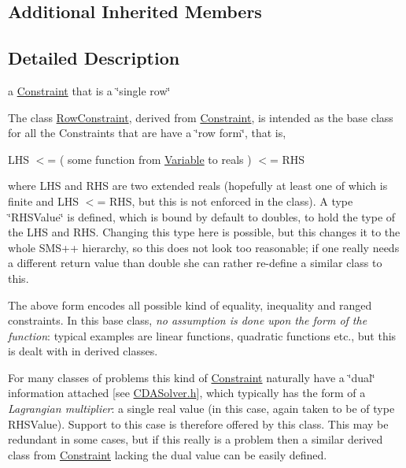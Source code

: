 \subsection*{Additional Inherited Members}


\subsection{Detailed Description}
a \mbox{\hyperlink{class_s_m_spp__di__unipi__it_1_1_constraint}{Constraint}} that is a \char`\"{}single row\char`\"{} 

The class \mbox{\hyperlink{class_s_m_spp__di__unipi__it_1_1_row_constraint}{Row\+Constraint}}, derived from \mbox{\hyperlink{class_s_m_spp__di__unipi__it_1_1_constraint}{Constraint}}, is intended as the base class for all the Constraints that are have a \char`\"{}row form\char`\"{}, that is,

L\+HS $<$= ( some function from \mbox{\hyperlink{class_s_m_spp__di__unipi__it_1_1_variable}{Variable}} to reals ) $<$= R\+HS

where L\+HS and R\+HS are two extended reals (hopefully at least one of which is finite and L\+HS $<$= R\+HS, but this is not enforced in the class). A type \char`\"{}\+R\+H\+S\+Value\char`\"{} is defined, which is bound by default to doubles, to hold the type of the L\+HS and R\+HS. Changing this type here is possible, but this changes it to the whole S\+M\+S++ hierarchy, so this does not look too reasonable; if one really needs a different return value than double she can rather re-\/define a similar class to this.

The above form encodes all possible kind of equality, inequality and ranged constraints. In this base class, {\itshape no assumption is done upon the form of the function}\+: typical examples are linear functions, quadratic functions etc., but this is dealt with in derived classes.

For many classes of problems this kind of \mbox{\hyperlink{class_s_m_spp__di__unipi__it_1_1_constraint}{Constraint}} naturally have a \char`\"{}dual\char`\"{} information attached \mbox{[}see \mbox{\hyperlink{_c_d_a_solver_8h}{C\+D\+A\+Solver.\+h}}\mbox{]}, which typically has the form of a {\itshape Lagrangian multiplier}\+: a single real value (in this case, again taken to be of type R\+H\+S\+Value). Support to this case is therefore offered by this class. This may be redundant in some cases, but if this really is a problem then a similar derived class from \mbox{\hyperlink{class_s_m_spp__di__unipi__it_1_1_constraint}{Constraint}} lacking the dual value can be easily defined.

